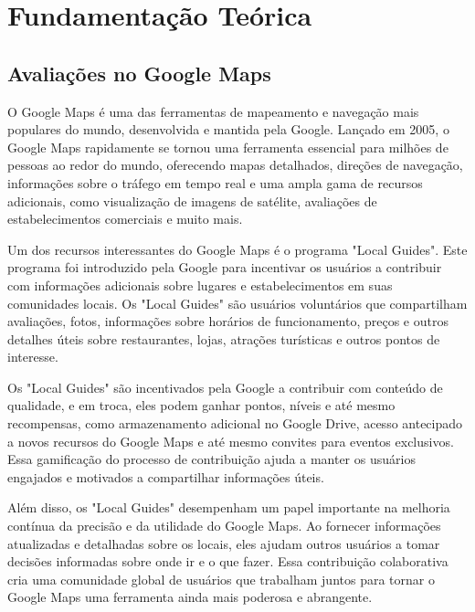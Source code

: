 \chapter{Fundamentação Teórica}
\label{cap:fund_teorica}



\section{Avaliações no Google Maps}
\label{cap:fund_teorica:sec:google_maps}

O Google Maps é uma das ferramentas de mapeamento e navegação mais populares do mundo, desenvolvida e mantida pela Google. Lançado em 2005, o Google Maps rapidamente se tornou uma ferramenta essencial para milhões de pessoas ao redor do mundo, oferecendo mapas detalhados, direções de navegação, informações sobre o tráfego em tempo real e uma ampla gama de recursos adicionais, como visualização de imagens de satélite, avaliações de estabelecimentos comerciais e muito mais.

Um dos recursos interessantes do Google Maps é o programa "Local Guides". Este programa foi introduzido pela Google para incentivar os usuários a contribuir com informações adicionais sobre lugares e estabelecimentos em suas comunidades locais. Os "Local Guides" são usuários voluntários que compartilham avaliações, fotos, informações sobre horários de funcionamento, preços e outros detalhes úteis sobre restaurantes, lojas, atrações turísticas e outros pontos de interesse.

Os "Local Guides" são incentivados pela Google a contribuir com conteúdo de qualidade, e em troca, eles podem ganhar pontos, níveis e até mesmo recompensas, como armazenamento adicional no Google Drive, acesso antecipado a novos recursos do Google Maps e até mesmo convites para eventos exclusivos. Essa gamificação do processo de contribuição ajuda a manter os usuários engajados e motivados a compartilhar informações úteis.

Além disso, os "Local Guides" desempenham um papel importante na melhoria contínua da precisão e da utilidade do Google Maps. Ao fornecer informações atualizadas e detalhadas sobre os locais, eles ajudam outros usuários a tomar decisões informadas sobre onde ir e o que fazer. Essa contribuição colaborativa cria uma comunidade global de usuários que trabalham juntos para tornar o Google Maps uma ferramenta ainda mais poderosa e abrangente.

